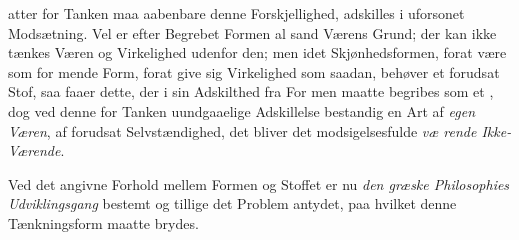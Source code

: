 atter for Tanken maa aabenbare denne Forskjellighed, adskilles
i uforsonet Modsætning. Vel er efter Begrebet Formen al sand
Værens Grund; der kan ikke tænkes Væren og Virkelighed
udenfor den; men idet Skjønhedsformen, forat være som for\-%
\setcounter{footnote}{0}%
mende Form, forat give sig Virkelighed som saadan, behøver
et forudsat Stof, saa faaer dette, der i sin Adskilthed fra For\-%
men maatte begribes som et , dog ved denne for Tanken
uundgaaelige Adskillelse bestandig en Art af \emph{egen Væren},
af forudsat Selvstændighed, det bliver det modsigelsesfulde \emph{væ\-%
rende Ikke-Værende}.

Ved det angivne Forhold mellem Formen og Stoffet er nu
\emph{den græske Philosophies Udviklingsgang} bestemt og
tillige det Problem antydet, paa hvilket denne Tænkningsform
maatte brydes.

